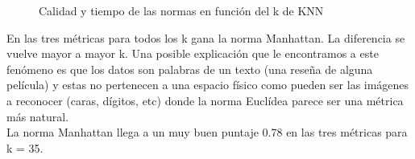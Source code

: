 \begin{figure}[H]
\caption{Calidad y tiempo de las normas en función del k de KNN}
\label{fig:exp3-calidad-normas}
\end{figure}

En las tres métricas para todos los k gana la norma Manhattan. La diferencia se vuelve mayor a mayor k.
Una posible explicación que le encontramos a este fenómeno es que los datos son palabras de un texto (una reseña de alguna película) y estas no pertenecen a una espacio físico como pueden ser las imágenes a reconocer (caras, dígitos, etc) donde la norma Euclídea parece ser una métrica más natural. \\
La norma Manhattan llega a un muy buen puntaje 0.78 en las tres métricas para k = 35. \\

